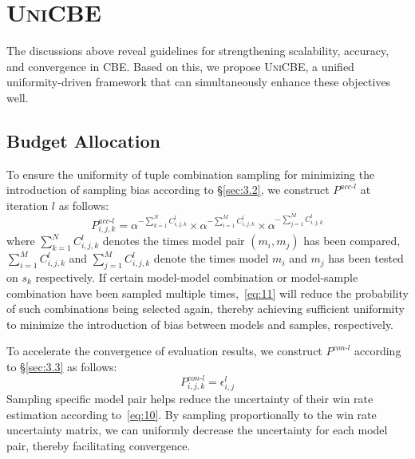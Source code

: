 \section{\textsc{UniCBE}}
The discussions above reveal guidelines for strengthening scalability, accuracy, and convergence in CBE. Based on this, we propose \textsc{UniCBE}, a unified uniformity-driven framework that can simultaneously enhance these objectives well.

\subsection{Budget Allocation}
To ensure the uniformity of tuple combination sampling for minimizing the introduction of sampling bias according to \S\ref{sec:3.2}, we construct $P^{acc\text{-}l}$ 
 at iteration $l$ as follows:
\begin{equation}
    P^{acc\text{-}l}_{i,j,k} = \alpha^{-\sum_{k=1}^{N} C^l_{i,j,k}}\times \alpha^{-\sum_{i=1}^{M} C^l_{i,j,k}}\times \alpha^{-\sum_{j=1}^{M} C^l_{i,j,k}}
    \label{eq:11}
\end{equation}
where $\sum_{k=1}^{N} C^l_{i,j,k}$ denotes the times model pair $(m_i,m_j)$ has been compared, $\sum_{i=1}^{M} C^l_{i,j,k}$ and $\sum_{j=1}^{M} C^l_{i,j,k}$ denote the times model $m_i$ and $m_j$ has been tested on $s_k$ respectively. 
If certain model-model combination or model-sample combination have been sampled multiple times,~\eqref{eq:11} will reduce the probability of such combinations being selected again, thereby achieving sufficient uniformity to minimize the introduction of bias between models and samples, respectively.

To accelerate the convergence of evaluation results, we construct $P^{con\text{-}l}$ according to \S\ref{sec:3.3} as follows:
\begin{equation}
    P^{con\text{-}l}_{i,j,k} = \epsilon^l_{i,j}
    \label{eq:12}
\end{equation}
Sampling specific model pair helps reduce the uncertainty of their win rate estimation according to~\eqref{eq:10}. By sampling proportionally to the win rate uncertainty matrix, we can uniformly decrease the uncertainty for each model pair, thereby facilitating convergence.
% 

